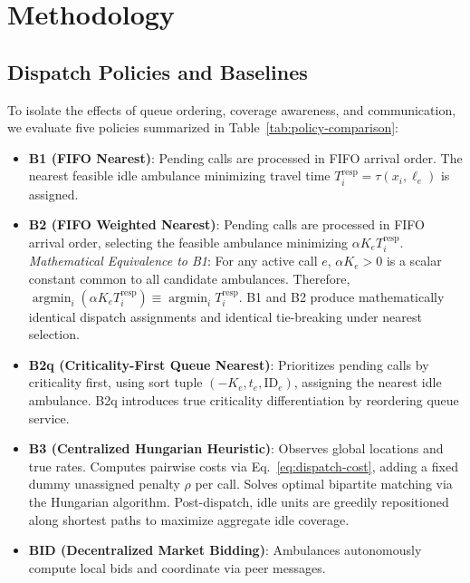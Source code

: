 \documentclass{article}
\begin{document}
\section{Methodology}
\subsection{Dispatch Policies and Baselines}
To isolate the effects of queue ordering, coverage awareness, and communication, we evaluate five policies summarized in Table~\ref{tab:policy-comparison}:
\begin{itemize}\itemsep1pt
\item \textbf{B1 (FIFO Nearest)}: Pending calls are processed in FIFO arrival order. The nearest feasible idle ambulance minimizing travel time $T_i^{\mathrm{resp}} = \tau(x_i, \ell_e)$ is assigned.
\item \textbf{B2 (FIFO Weighted Nearest)}: Pending calls are processed in FIFO arrival order, selecting the feasible ambulance minimizing $\alpha K_e T_i^{\mathrm{resp}}$.
\textit{Mathematical Equivalence to B1}: For any active call $e$, $\alpha K_e > 0$ is a scalar constant common to all candidate ambulances. Therefore, $\operatorname{argmin}_{i} (\alpha K_e T_i^{\mathrm{resp}}) \equiv \operatorname{argmin}_{i} T_i^{\mathrm{resp}}$. B1 and B2 produce mathematically identical dispatch assignments and identical tie-breaking under nearest selection.
\item \textbf{B2q (Criticality-First Queue Nearest)}: Prioritizes pending calls by criticality first, using sort tuple $(-K_e, t_e, \mathrm{ID}_e)$, assigning the nearest idle ambulance. B2q introduces true criticality differentiation by reordering queue service.
\item \textbf{B3 (Centralized Hungarian Heuristic)}: Observes global locations and true rates. Computes pairwise costs via Eq.~\eqref{eq:dispatch-cost}, adding a fixed dummy unassigned penalty $\rho$ per call. Solves optimal bipartite matching via the Hungarian algorithm. Post-dispatch, idle units are greedily repositioned along shortest paths to maximize aggregate idle coverage.
\item \textbf{BID (Decentralized Market Bidding)}: Ambulances autonomously compute local bids and coordinate via peer messages.
\end{itemize}
\end{document}
